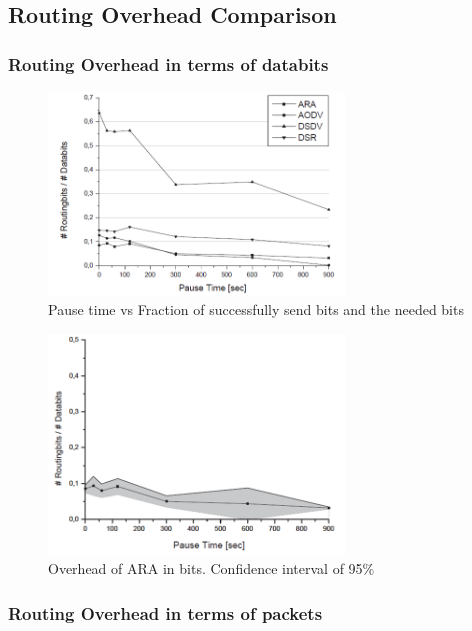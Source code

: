 \subsection{Routing Overhead Comparison}
\subsubsection{Routing Overhead in terms of databits}

\begin{figure}[t!]
\centering
\includegraphics[width=0.7\textwidth]{Picture3.png}
\caption{\label{fig:picture3}Pause time vs Fraction of successfully send bits and the needed bits}
\end{figure}

\begin{figure}[t!]
\centering
\includegraphics[width=0.7\textwidth]{Picture4.png}
\caption{\label{fig:picture4}Overhead of ARA in bits. Confidence interval of 95\%}
\end{figure}



\subsubsection{Routing Overhead in terms of packets}

